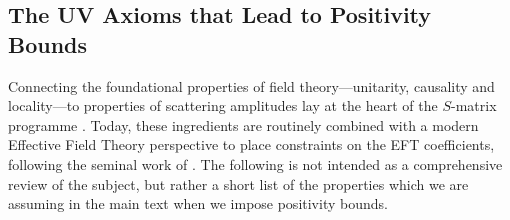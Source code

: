 \documentclass[11pt]{article}
\begin{document}
\subsection{The UV Axioms that Lead to Positivity Bounds}
\label{app:pos_derivation}

Connecting the foundational properties of field theory---unitarity, causality and locality---to properties of scattering amplitudes lay at the heart of the $S$-matrix programme \cite{Chew, Eden}. 
Today, these ingredients are routinely combined with a modern Effective Field Theory perspective to place constraints on the EFT coefficients, following the seminal work of \cite{Adams:2006sv}. 
The following is not intended as a comprehensive review of the subject, but rather a short list of the properties which we are assuming in the main text when we impose positivity bounds. 

\end{document}
